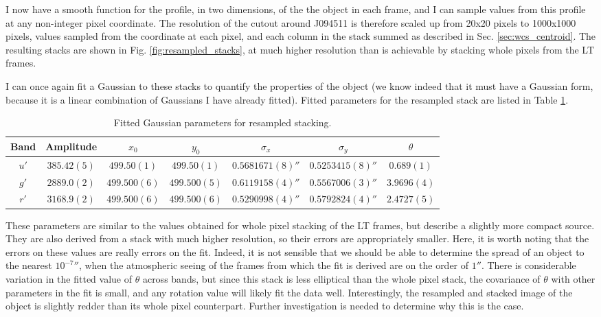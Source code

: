 \documentclass[a4paper,11pt]{article}
\begin{document}
I now have a smooth function for the profile, in two dimensions, of the the object in each frame, and I can sample values from this profile at any non-integer pixel coordinate. The resolution of the cutout around J094511 is therefore scaled up from 20x20 pixels to 1000x1000 pixels, values sampled from the coordinate at each pixel, and each column in the stack summed as described in Sec. \ref{sec:wcs_centroid}. The resulting stacks are shown in Fig. \ref{fig:resampled_stacks}, at much higher resolution than is achievable by stacking whole pixels from the LT frames.

I can once again fit a Gaussian to these stacks to quantify the properties of the object (we know indeed that it must have a Gaussian form, because it is a linear combination of Gaussians I have already fitted). Fitted parameters for the resampled stack are listed in Table \ref{tab:resampled_gaussians}.

\begin{table}[h!]
    \centering
    \begin{tabular}{| c | c | c | c | c | c | c |} \hline
        Band & Amplitude & $x_0$ & $y_0$ & $\sigma_x$ & $\sigma_y$ & $\theta$ \\ \hline \hline
        $u'$ & $385.42(5)$ & $499.50(1)$ & $499.50(1)$ & $0.5681671(8)''$ & $0.5253415(8)''$ & $0.689(1)$ \\
        $g'$ & $2889.0(2)$ & $499.500(6)$ & $499.500(5)$ & $0.6119158(4)''$ & $0.5567006(3)''$ & $3.9696(4)$ \\
        $r'$ & $3168.9(2)$ & $499.500(6)$ & $499.500(6)$ & $0.5290998(4)''$ & $0.5792824(4)''$ & $2.4727(5)$ \\ \hline
    \end{tabular}
    \caption{Fitted Gaussian parameters for resampled stacking.}
    \label{tab:resampled_gaussians}
\end{table}

\noindent These parameters are similar to the values obtained for whole pixel stacking of the LT frames, but describe a slightly more compact source. They are also derived from a stack with much higher resolution, so their errors are appropriately smaller. Here, it is worth noting that the errors on these values are really errors on the fit. Indeed, it is not sensible that we should be able to determine the spread of an object to the nearest ${10^{-7}}''$, when the atmospheric seeing of the frames from which the fit is derived are on the order of $1''$. There is considerable variation in the fitted value of $\theta$ across bands, but since this stack is less elliptical than the whole pixel stack, the covariance of $\theta$ with other parameters in the fit is small, and any rotation value will likely fit the data well. Interestingly, the resampled and stacked image of the object is slightly redder than its whole pixel counterpart. Further investigation is needed to determine why this is the case.
\end{document}

